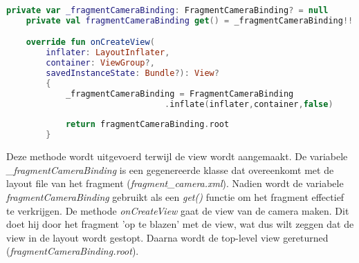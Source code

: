 \begin{lstlisting}[language=Kotlin, caption=onCreateView in CameraFragment.kt, label={lst:onCreateViewCameraFragment}]
    private var _fragmentCameraBinding: FragmentCameraBinding? = null
    private val fragmentCameraBinding get() = _fragmentCameraBinding!!

    override fun onCreateView(
        inflater: LayoutInflater,
        container: ViewGroup?,
        savedInstanceState: Bundle?): View?
        {
            _fragmentCameraBinding = FragmentCameraBinding
                                .inflate(inflater,container,false)
    
            return fragmentCameraBinding.root
        }
\end{lstlisting}
Deze methode wordt uitgevoerd terwijl de view wordt aangemaakt. De variabele \emph{\_fragmentCameraBinding} is een gegenereerde klasse dat overeenkomt met de layout file van het fragment (\emph{fragment\_camera.xml}). Nadien wordt de variabele \emph{fragmentCameraBinding} gebruikt als een \emph{get()} functie om het fragment effectief te verkrijgen. De methode \emph{onCreateView} gaat de view van de camera maken. Dit doet hij door het fragment 'op te blazen' met de view, wat dus wilt zeggen dat de view in de layout wordt gestopt. Daarna wordt de top-level view gereturned (\emph{fragmentCameraBinding.root}).

